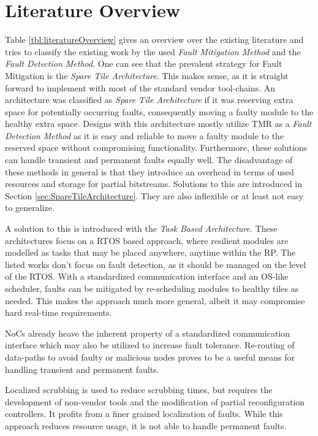 \section{Literature Overview}\label{sec:literatureOverview}
Table \ref{tbl:literatureOverview} gives an overview over the existing literature and tries to classify the existing work by the used \textit{Fault Mitigation Method} and the \textit{Fault Detection Method}.
One can see that the prevalent strategy for Fault Mitigation is the \textit{Spare Tile Architecture}. 
This makes sense, as it is straight forward to implement with most of the standard vendor tool-chains.
An architecture was classified as \textit{Spare Tile Architecture} if it was reserving extra space for potentially occurring faults, consequently moving a faulty module to the healthy extra space.
Designs with this architecture mostly utilize \gls{TMR} as a \textit{Fault Detection Method} as it is easy and reliable to move a faulty module to the reserved space without compromising functionality.
Furthermore, these solutions can handle transient and permanent faults equally well.
The disadvantage of these methods in general is that they introduce an overhead in terms of used resources and storage for partial bitstreams.
Solutions to this are introduced in Section \ref{sec:SpareTileArchitecture}. 
They are also inflexible or at least not easy to generalize.

A solution to this is introduced with the \textit{Task Based Architecture}.
These architectures focus on a \gls{RTOS} based approach, where resilient modules are modelled as tasks that may be placed anywhere, anytime within the \gls{RP}. 
The listed works don't focus on fault detection, as it should be managed on the level of the \gls{RTOS}.
With a standardized communication interface and an OS-like scheduler, faults can be mitigated by re-scheduling modules to healthy tiles as needed. 
This makes the approach much more general, albeit it may compromise hard real-time requirements.

\glspl{NoC} already heave the inherent property of a standardized communication interface which may also be utilized to increase fault tolerance.
Re-routing of data-paths to avoid faulty or malicious nodes proves to be a useful means for handling transient and permanent faults.

Localized scrubbing is used to reduce scrubbing times, but requires the development of non-vendor tools and the modification of partial reconfiguration controllers.
It profits from a finer grained localization of faults.
While this approach reduces resource usage, it is not able to handle permanent faults. 


